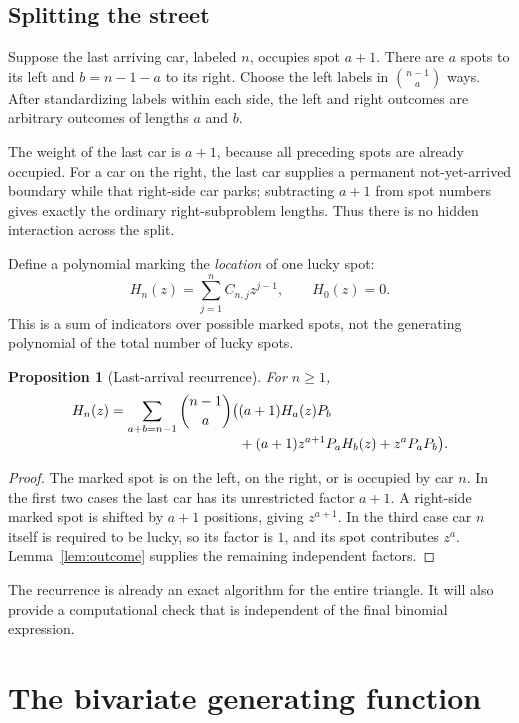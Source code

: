 \documentclass[11pt,letterpaper]{article}
\numberwithin{equation}{section}
\newtheorem{proposition}[theorem]{Proposition}
\theoremstyle{definition}
\begin{document}
\subsection{Splitting the street}
Suppose the last arriving car, labeled $n$, occupies spot $a+1$. There are
$a$ spots to its left and $b=n-1-a$ to its right. Choose the left labels in
$\binom{n-1}{a}$ ways. After standardizing labels within each side, the left
and right outcomes are arbitrary outcomes of lengths $a$ and $b$.

The weight of the last car is $a+1$, because all preceding spots are already
occupied. For a car on the right, the last car supplies a permanent
not-yet-arrived boundary while that right-side car parks; subtracting $a+1$
from spot numbers gives exactly the ordinary right-subproblem lengths.
Thus there is no hidden interaction across the split.

Define a polynomial marking the \emph{location} of one lucky spot:
\begin{equation}\label{eq:Hn}
 H_n(z)=\sum_{j=1}^n C_{n,j}z^{j-1},\qquad H_0(z)=0.
\end{equation}
This is a sum of indicators over possible marked spots, not the generating
polynomial of the total number of lucky spots.

\begin{proposition}[Last-arrival recurrence]\label{prop:recurrence}
For $n\ge1$,
\begin{align}\label{eq:recurrence}
 H_n(z)=\sum_{a+b=n-1}\binom{n-1}{a}\bigl(
 &(a+1)H_a(z)P_b \notag\\[-3pt]
 &+(a+1)z^{a+1}P_aH_b(z)+z^aP_aP_b\bigr).
\end{align}
\end{proposition}
\begin{proof}
The marked spot is on the left, on the right, or is occupied by car $n$.
In the first two cases the last car has its unrestricted factor $a+1$.
A right-side marked spot is shifted by $a+1$ positions, giving $z^{a+1}$.
In the third case car $n$ itself is required to be lucky, so its factor is
$1$, and its spot contributes $z^a$. Lemma~\ref{lem:outcome} supplies the
remaining independent factors.
\end{proof}

The recurrence is already an exact algorithm for the entire triangle. It
will also provide a computational check that is independent of the final
binomial expression.

\section{The bivariate generating function}
\label{sec:gf}
\end{document}
